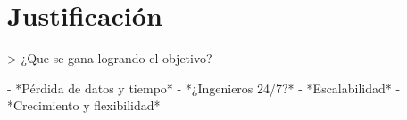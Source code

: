 \section{Justificación}

> ¿Que se gana logrando el objetivo?

- *Pérdida de datos y tiempo*
- *¿Ingenieros 24/7?*
- *Escalabilidad*
- *Crecimiento y flexibilidad*
